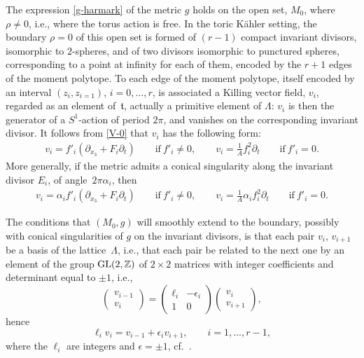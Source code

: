 \documentclass[10pt,a4paper]{amsart}
\numberwithin{equation}{section}
\begin{document}
The expression \eqref{g-harmark} of the metric $g$ holds on the open set, $M _0$, where $\rho \neq 0$, i.e., where the torus action is free. In the toric K\"ahler setting, the boundary $\rho = 0$ of this open set is formed of $(r - 1)$ compact invariant divisors, isomorphic to $2$-spheres, and of two divisors isomorphic to punctured spheres, corresponding to a point at infinity for each of them, encoded by the $r + 1$ edges of the moment polytope. To each edge of the moment polytope, itself encoded by an interval $(z_i, z_{i = 1})$, $i = 0, \dots, r$, is associated a Killing vector field, $v_i$, regarded as an element of~$\mathfrak{t}$, actually a primitive element of $\Lambda$: $v_i$ is then the generator of a $S^1$-action of period $2 \pi$, and vanishes on the corresponding invariant divisor. It follows from \eqref{V-0} that $v _i$ has the following form:
\begin{gather} v _i = f'_i (\partial _{x_3} + F _i \partial _t) \qquad \text{if}\ f'_i \neq 0, \qquad
 v _i = \frac{1}{A} f_i ^2 \partial _t \qquad \text{if}\ f'_i = 0. \label{v}
\end{gather}
 More generally, if the metric admits a conical singularity along the invariant divisor $E _i$, of angle~$2 \pi \alpha _i$, then
 \begin{gather}
 v _i = \alpha _i f'_i (\partial _{x_3} + F _i \partial _t) \qquad \text{if}\ f'_i \neq 0, \qquad
 v _i = \frac{1}{A} \alpha _i f_i ^2 \partial _t \qquad \text{if}\ f'_i = 0.\label{v-alpha}
\end{gather}


The conditions that $(M_0, g)$ will smoothly extend to the boundary, possibly with conical singularities of $g$ on the invariant divisors, is that each pair $v _i$, $v_{i + 1}$ be a basis of the lattice~$\Lambda$, i.e., that each pair be related to the next one by an element of the group ${\rm GL} (2, \mathbb{Z})$ of $2 \times 2$ matrices with integer coefficients and determinant equal to $ \pm 1$, i.e.,
\[ \begin{pmatrix} v_{i - 1} \\ v_i \end{pmatrix} = \begin{pmatrix} \ell _i & - \epsilon _i \\ 1 & 0 \end{pmatrix} \begin{pmatrix} \label{v-matrix} v _i \\ v _{i + 1} \end{pmatrix}, \]
hence
\[%
\ell _i v _i = v_{i - 1} + \epsilon _i v _{i + 1}, \qquad i = 1, \dots, r - 1, \]
where the $\ell _i$ are integers and $\epsilon = \pm 1$, cf.\ \cite[Section~8]{BG}.
\end{document}

